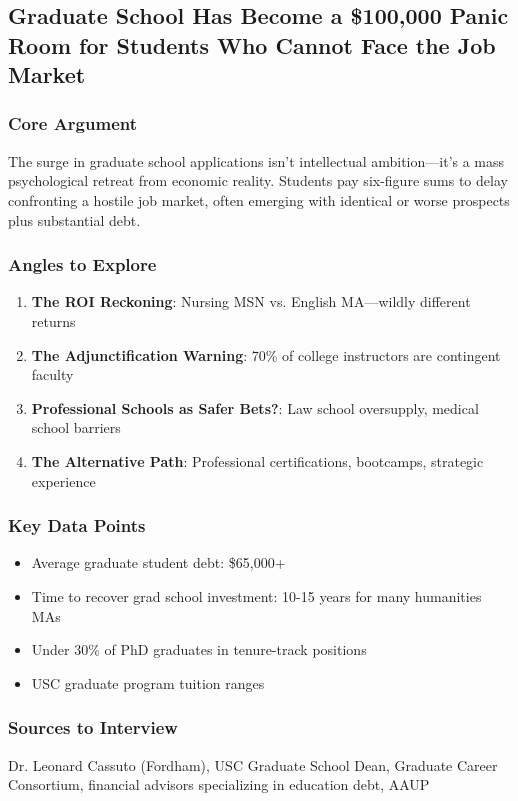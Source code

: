 \documentclass[11pt,letterpaper]{article}
\begin{document}
\newpage
\subsection{Graduate School Has Become a \$100,000 Panic Room for Students Who Cannot Face the Job Market}

\subsubsection*{Core Argument}
The surge in graduate school applications isn't intellectual ambition---it's a mass psychological retreat from economic reality. Students pay six-figure sums to delay confronting a hostile job market, often emerging with identical or worse prospects plus substantial debt.

\subsubsection*{Angles to Explore}
\begin{enumerate}[noitemsep]
    \item \textbf{The ROI Reckoning}: Nursing MSN vs. English MA---wildly different returns
    \item \textbf{The Adjunctification Warning}: 70\% of college instructors are contingent faculty
    \item \textbf{Professional Schools as Safer Bets?}: Law school oversupply, medical school barriers
    \item \textbf{The Alternative Path}: Professional certifications, bootcamps, strategic experience
\end{enumerate}

\subsubsection*{Key Data Points}
\begin{itemize}[noitemsep]
    \item Average graduate student debt: \$65,000+
    \item Time to recover grad school investment: 10-15 years for many humanities MAs
    \item Under 30\% of PhD graduates in tenure-track positions
    \item USC graduate program tuition ranges
\end{itemize}

\subsubsection*{Sources to Interview}
Dr. Leonard Cassuto (Fordham), USC Graduate School Dean, Graduate Career Consortium, financial advisors specializing in education debt, AAUP
\end{document}

